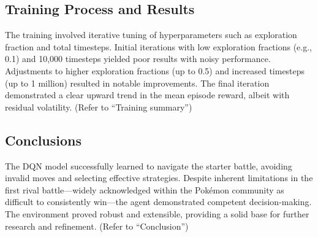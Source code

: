 \subsection{Training Process and Results}

The training involved iterative tuning of hyperparameters such as exploration fraction and total timesteps. Initial iterations with low exploration fractions (e.g., 0.1) and 10,000 timesteps yielded poor results with noisy performance. Adjustments to higher exploration fractions (up to 0.5) and increased timesteps (up to 1 million) resulted in notable improvements. The final iteration demonstrated a clear upward trend in the mean episode reward, albeit with residual volatility. (Refer to “Training summary”)

\subsection{Conclusions}

The DQN model successfully learned to navigate the starter battle, avoiding invalid moves and selecting effective strategies. Despite inherent limitations in the first rival battle—widely acknowledged within the Pokémon community as difficult to consistently win—the agent demonstrated competent decision-making. The environment proved robust and extensible, providing a solid base for further research and refinement. (Refer to “Conclusion”)